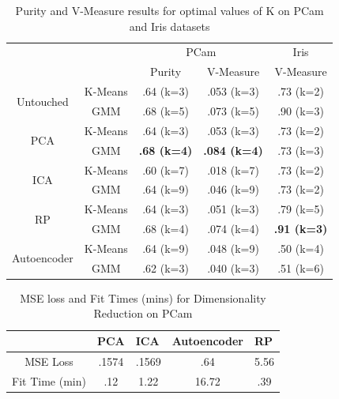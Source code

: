 \documentclass[letter]{article}
\begin{document}
\begin{table}
  \centering
  \begin{tabular}{cc|c|c|c|}
  \cline{3-5}
   &  & \multicolumn{2}{c|}{PCam} & Iris \\ \cline{3-5} 
   &  & Purity & V-Measure & V-Measure \\ \hline
  \multicolumn{1}{|c|}{\multirow{2}{*}{Untouched}} & K-Means & .64 (k=3) & .053 (k=3) & .73 (k=2) \\ \cline{2-5} 
  \multicolumn{1}{|c|}{} & GMM & .68 (k=5) & .073 (k=5) & .90 (k=3) \\ \hline
  \multicolumn{1}{|c|}{\multirow{2}{*}{PCA}} & K-Means & .64 (k=3) & .053 (k=3) & .73 (k=2) \\ \cline{2-5} 
  \multicolumn{1}{|c|}{} & GMM & \textbf{.68 (k=4)} & \textbf{.084 (k=4)} & .73 (k=3) \\ \hline
  \multicolumn{1}{|c|}{\multirow{2}{*}{ICA}} & K-Means & .60 (k=7) & .018 (k=7) & .73 (k=2) \\ \cline{2-5} 
  \multicolumn{1}{|c|}{} & GMM & .64 (k=9) & .046 (k=9) & .73 (k=2) \\ \hline
  \multicolumn{1}{|c|}{\multirow{2}{*}{RP}} & K-Means & .64 (k=3) & .051 (k=3) & .79 (k=5) \\ \cline{2-5} 
  \multicolumn{1}{|c|}{} & GMM & .68 (k=4) & .074 (k=4) & \textbf{.91 (k=3)} \\ \hline
  \multicolumn{1}{|c|}{\multirow{2}{*}{Autoencoder}} & K-Means & .64 (k=9) & .048 (k=9) & .50 (k=4) \\ \cline{2-5} 
  \multicolumn{1}{|c|}{} & GMM & .62 (k=3) & .040 (k=3) & .51 (k=6) \\ \hline
  \end{tabular}
  \caption{Purity and V-Measure results for optimal values of K on PCam and Iris datasets}
\end{table}

\begin{table}
  \centering
  \begin{tabular}{l|l|l|l|l|}
  \cline{2-5}
                                 & PCA                        & ICA                        & Autoencoder              & RP                        \\ \hline
  \multicolumn{1}{|c|}{MSE Loss} & \multicolumn{1}{c|}{.1574} & \multicolumn{1}{c|}{.1569} & \multicolumn{1}{c|}{.64} & \multicolumn{1}{c|}{5.56} \\ \hline
  \multicolumn{1}{|c|}{Fit Time (min)} &\multicolumn{1}{c|}{.12}&\multicolumn{1}{c|}{1.22}&\multicolumn{1}{c|}{16.72}&\multicolumn{1}{c|}{.39} \\ \hline
  \end{tabular}
  \caption{MSE loss and Fit Times (mins) for Dimensionality Reduction on PCam}
\end{table}
\end{document}
